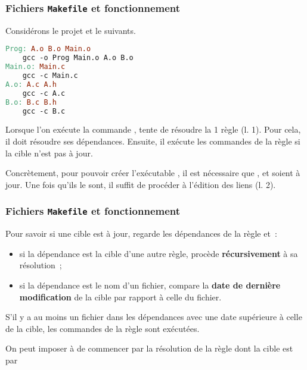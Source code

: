 \begin{frame}[fragile]
\frametitle{Fichiers {\tt Makefile} et fonctionnement}
Considérons le projet et le  suivants.
\begin{multicols}{2}
\begin{center}
\end{center}
\bigskip
\bigskip
\begin{lstlisting}[language=make]
Prog: A.o B.o Main.o
    gcc -o Prog Main.o A.o B.o
Main.o: Main.c
    gcc -c Main.c
A.o: A.c A.h
    gcc -c A.c
B.o: B.c B.h
    gcc -c B.c
\end{lstlisting}
\end{multicols}
\bigskip

Lorsque l'on exécute la commande ,  tente de
résoudre la 1\iere{} règle (l. 1). Pour cela, il doit résoudre ses
dépendances. Ensuite, il exécute les commandes de la règle si la cible
n'est pas à jour.
\medskip

Concrètement, pour pouvoir créer l'exécutable , il est
nécessaire que ,  et  soient à jour.
Une fois qu'ils le sont, il suffit de procéder à l'édition des liens
(l. 2).
\end{frame}

\begin{frame}[fragile]
\frametitle{Fichiers {\tt Makefile} et fonctionnement}
Pour savoir si une cible est à jour,  regarde les dépendances
de la règle et~:
\begin{itemize}
    \item si la dépendance est la cible d'une autre règle, 
    procède {\bf récursivement} à sa résolution~;
    \smallskip

    \item si la dépendance est le nom d'un fichier,  compare
    la {\bf date de dernière modification} de la cible par rapport à
    celle du fichier.
\end{itemize}
\smallskip

S'il y a au moins un fichier dans les dépendances avec une date supérieure
à celle de la cible, les commandes de la règle sont exécutées.
\bigskip

On peut imposer à  de commencer par la résolution de la
règle dont la cible est  par
\begin{center}
\end{center}
\end{frame}

